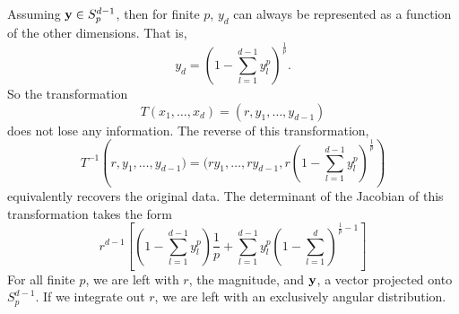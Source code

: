 Assuming ${\bf y} \in S_{p}^{d-1}$, then for finite $p$, $y_d$ can always be represented as a
  function of the other dimensions.  That is,
  \begin{equation*}
    y_d = \left(1 - \sum_{l = 1}^{d-1}y_l^p\right)^{\frac{1}{p}}.
  \end{equation*}
  So the transformation
  \begin{equation*}
    T(x_1,\ldots,x_d) = (r,y_1,\ldots,y_{d-1})
  \end{equation*}
  does not lose any information.  The reverse of this transformation,
  \begin{equation*}
    T^{-1}\left(r,y_1,\ldots,y_{d-1}) =
      (ry_1,\ldots,ry_{d-1},r\left(1 - \sum_{l = 1}^{d-1}y_l^p\right)^{\frac{1}{p}}\right)
  \end{equation*}
  equivalently recovers the original data.  The determinant of the Jacobian of this transformation
  takes the form
  \begin{equation*}
    r^{d-1}\left[\left(1 - \sum_{l = 1}^{d-1}y_l^p\right)\frac{1}{p} +
        \sum_{l = 1}^{d-1}y_l^p\left(1 - \sum_{l=1}^d\right)^{\frac{1}{p} - 1}\right]
  \end{equation*}
  For all finite $p$, we are left with $r$, the magnitude,
  and ${\bf y}$, a vector projected onto $S_{p}^{d-1}$.  If we integrate out $r$, we are left with
  an exclusively angular distribution.
